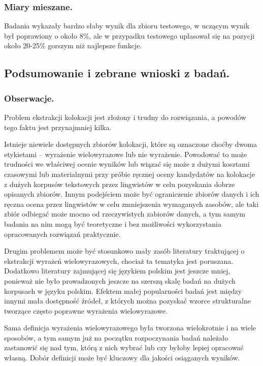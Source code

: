 \documentclass[11pt,a4paper]{llncs}
\begin{document}
\subsubsection{Miary mieszane.}
Badania wykazały bardzo słaby wynik dla zbioru testowego, w uczącym wynik był poprawiony o około 8\%, ale w przypadku testowego uplasował się na pozycji około 20-25\% gorszym niż najlepsze funkcje.


\subsection{Podsumowanie i zebrane wnioski z badań.}

\subsubsection{Obserwacje.}
Problem ekstrakcji kolokacji jest złożony i trudny do rozwiązania, a powodów tego faktu jest przynajmniej kilka.

\par
Istnieje niewiele dostępnych zbiorów kolokacji, które są oznaczone choćby dwoma etykietami -- wyrażenie wielowyrazowe lub nie wyrażenie.
Powodować to może trudności we właściwej ocenie wyników lub wiązać się może z dużymi kosztami czasowymi lub materialnymi przy próbie ręcznej oceny kandydatów na kolokacje z dużych korpusów tekstowych przez lingwistów w celu pozyskania dobrze opisanych zbiorów.
Innym podejściem może być ograniczenie zbiorów danych i ich ręczna ocena przez lingwistów w celu zmniejszenia wymaganych zasobów, ale taki zbiór odbiegać może mocno od rzeczywistych zabiorów danych, a tym samym badania na nim mogą być teoretyczne i bez możliwości wykorzystania opracowanych rozwiązań praktycznie.

\par
Drugim problemem może być stosunkowo mały zasób literatury traktującej o ekstrakcji wyrażeń wielowyrazowych, chociaż ta tematyka jest poruszana.
Dodatkowo literatury zajmującej się językiem polskim jest jeszcze mniej, ponieważ nie było prowadzonych jeszcze na szerszą skalę badań na dużych korpusach w języku polskim.
Efektem małej popularności badań jest między innymi mała dostępność źródeł, z których można pozyskać wzorce strukturalne tworzące często poprawne wyrażenia wielowyrazowe.

\par
Sama definicja wyrażenia wielowyrazowego była tworzona wielokrotnie i na wiele sposobów, a tym samym już na początku rozpoczynania badań należało zastanowić się nad tym, którą z nich wybrać lub czy byłoby lepiej opracować własną.
Dobór definicji może być kluczowy dla jakości osiąganych wyników.
\end{document}
